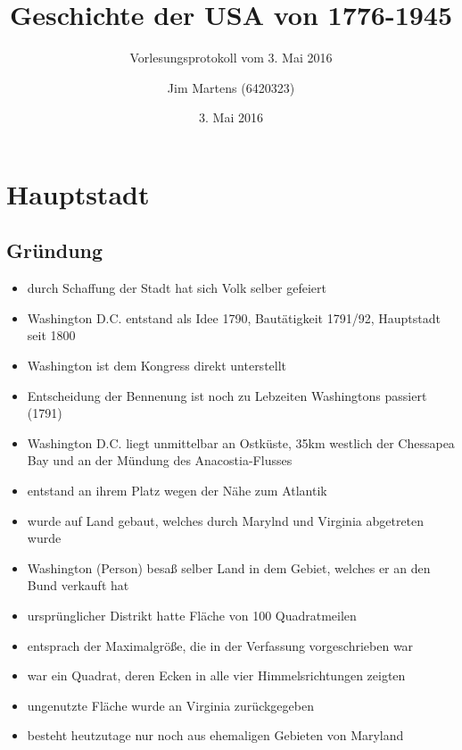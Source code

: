 \documentclass[10pt,a4paper,oneside,ngerman,numbers=noenddot]{scrartcl}
\newenvironment{myitemize}{\begin{itemize}\itemsep -8pt}{\end{itemize}} %
\begin{document}
\author{Jim Martens (6420323)}
\title{Geschichte der USA von 1776-1945}
\subtitle{Vorlesungsprotokoll vom 3. Mai 2016}
\date{3. Mai 2016}
\maketitle

\section*{Hauptstadt}

\subsection*{Gründung}
\begin{myitemize}
    \item durch Schaffung der Stadt hat sich Volk selber gefeiert
    \item Washington D.C. entstand als Idee 1790, Bautätigkeit 1791/92,
          Hauptstadt seit 1800
    \item Washington ist dem Kongress direkt unterstellt
    \item Entscheidung der Bennenung ist noch zu Lebzeiten Washingtons passiert (1791)
    \item Washington D.C. liegt unmittelbar an Ostküste, 35km westlich
          der Chessapea Bay und an der Mündung des Anacostia-Flusses
    \item entstand an ihrem Platz wegen der Nähe zum Atlantik
    \item wurde auf Land gebaut, welches durch Marylnd und Virginia abgetreten wurde
    \item Washington (Person) besaß selber Land in dem Gebiet, welches er an den Bund verkauft hat
    \item ursprünglicher Distrikt hatte Fläche von 100 Quadratmeilen
    \item entsprach der Maximalgröße, die in der Verfassung vorgeschrieben war
    \item war ein Quadrat, deren Ecken in alle vier Himmelsrichtungen zeigten
    \item ungenutzte Fläche wurde an Virginia zurückgegeben
    \item besteht heutzutage nur noch aus ehemaligen Gebieten von Maryland
\end{myitemize}
\end{document}
